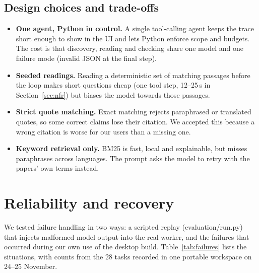 \documentclass{article}
\newcommand{\code}[1]{{\ttfamily\small\hyphenchar\font=-1\relax #1}}
\begin{document}
\subsection{Design choices and trade-offs}
\begin{itemize}
  \item \textbf{One agent, Python in control.} A single tool-calling agent keeps the trace short enough
  to show in the UI and lets Python enforce scope and budgets. The cost is that discovery,
  reading and checking share one model and one failure mode (invalid JSON at the final step).
  \item \textbf{Seeded readings.} Reading a deterministic set of matching passages before the loop
  makes short questions cheap (one tool step, 12--25\,s in Section~\ref{sec:nfr}) but biases the model
  towards those passages.
  \item \textbf{Strict quote matching.} Exact matching rejects paraphrased or translated quotes, so
  some correct claims lose their citation. We accepted this because a wrong citation is worse for our
  users than a missing one.
  \item \textbf{Keyword retrieval only.} BM25 is fast, local and explainable, but misses paraphrases
  across languages. The prompt asks the model to retry with the papers' own terms instead.
\end{itemize}

\section{Reliability and recovery}
\label{sec:reliability}
We tested failure handling in two ways: a scripted replay (\code{evaluation/run.py}) that injects
malformed model output into the real worker, and the failures that occurred during our own use of the
desktop build. Table~\ref{tab:failures} lists the situations, with counts from the 28 tasks recorded
in one portable workspace on 24--25 November.
\end{document}
